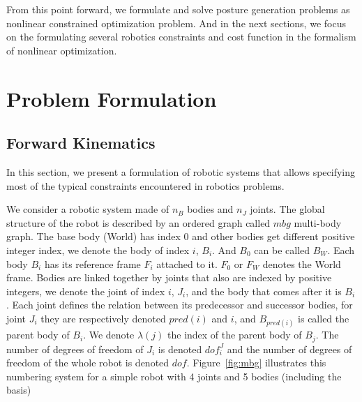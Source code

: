 From this point forward, we formulate and solve posture generation problems as nonlinear constrained optimization problem. And in the next sections, we focus on the formulating several robotics constraints and cost function in the formalism of nonlinear optimization.



\section{Problem Formulation}
\label{sec:pg_formulation}


\subsection{Forward Kinematics}
\label{sub:forward_kinematics}


In this section, we present a formulation of robotic systems that allows specifying most of the typical constraints encountered in robotics problems.

We consider a robotic system made of $n_B$ bodies and $n_J$ joints.
The global structure of the robot is described by an ordered graph called $mbg$ multi-body graph.
The base body (World) has index $0$ and other bodies get different positive integer index, we denote the body of index $i$, $B_i$. And $B_0$ can be called $B_W$.
Each body $B_i$ has its reference frame $F_i$ attached to it.
$F_0$ or $F_W$ denotes the World frame.
Bodies are linked together by joints that also are indexed by positive integers, we denote the joint of index $i$, $J_i$, and the body that comes after it is $B_i$.
Each joint defines the relation between its predecessor and successor bodies, for joint $J_i$ they are respectively denoted $pred(i)$ and $i$, and $B_{pred(i)}$ is called the parent body of $B_{i}$.
We denote $\lambda(j)$ the index of the parent body of $B_j$.
The number of degrees of freedom of $J_i$ is denoted $dof^J_i$ and the number of degrees of freedom of the whole robot is denoted $dof$.
Figure~\ref{fig:mbg} illustrates this numbering system for a simple robot with 4 joints and 5 bodies (including the basis)

